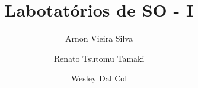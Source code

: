 \documentclass[12pt, times, a4paper, capchap, abnt-emphasize=bf]{abnt}
\author{Arnon Vieira Silva \and Renato Tsutomu Tamaki \and Wesley Dal Col}
\title{Labotat\'orios de SO - I}
\begin{document}
\maketitle

%

\sumario





%

%

%
\end{document}
